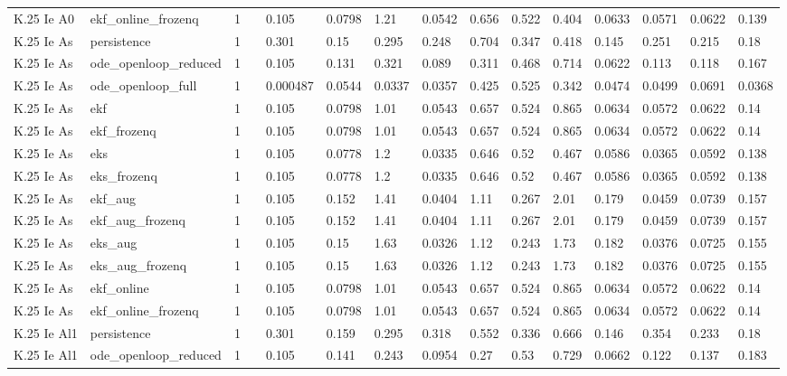 \begin{table}[t]
\begin{tabular}{lllllllllllllll}
K.25 Ie A0 & ekf\_online\_frozenq & 1 &  & 0.105 & 0.0798 & 1.21 & 0.0542 & 0.656 & 0.522 & 0.404 & 0.0633 & 0.0571 & 0.0622 & 0.139 \\
K.25 Ie As & persistence & 1 &  & 0.301 & 0.15 & 0.295 & 0.248 & 0.704 & 0.347 & 0.418 & 0.145 & 0.251 & 0.215 & 0.18 \\
K.25 Ie As & ode\_openloop\_reduced & 1 &  & 0.105 & 0.131 & 0.321 & 0.089 & 0.311 & 0.468 & 0.714 & 0.0622 & 0.113 & 0.118 & 0.167 \\
K.25 Ie As & ode\_openloop\_full & 1 &  & 0.000487 & 0.0544 & 0.0337 & 0.0357 & 0.425 & 0.525 & 0.342 & 0.0474 & 0.0499 & 0.0691 & 0.0368 \\
K.25 Ie As & ekf & 1 &  & 0.105 & 0.0798 & 1.01 & 0.0543 & 0.657 & 0.524 & 0.865 & 0.0634 & 0.0572 & 0.0622 & 0.14 \\
K.25 Ie As & ekf\_frozenq & 1 &  & 0.105 & 0.0798 & 1.01 & 0.0543 & 0.657 & 0.524 & 0.865 & 0.0634 & 0.0572 & 0.0622 & 0.14 \\
K.25 Ie As & eks & 1 &  & 0.105 & 0.0778 & 1.2 & 0.0335 & 0.646 & 0.52 & 0.467 & 0.0586 & 0.0365 & 0.0592 & 0.138 \\
K.25 Ie As & eks\_frozenq & 1 &  & 0.105 & 0.0778 & 1.2 & 0.0335 & 0.646 & 0.52 & 0.467 & 0.0586 & 0.0365 & 0.0592 & 0.138 \\
K.25 Ie As & ekf\_aug & 1 &  & 0.105 & 0.152 & 1.41 & 0.0404 & 1.11 & 0.267 & 2.01 & 0.179 & 0.0459 & 0.0739 & 0.157 \\
K.25 Ie As & ekf\_aug\_frozenq & 1 &  & 0.105 & 0.152 & 1.41 & 0.0404 & 1.11 & 0.267 & 2.01 & 0.179 & 0.0459 & 0.0739 & 0.157 \\
K.25 Ie As & eks\_aug & 1 &  & 0.105 & 0.15 & 1.63 & 0.0326 & 1.12 & 0.243 & 1.73 & 0.182 & 0.0376 & 0.0725 & 0.155 \\
K.25 Ie As & eks\_aug\_frozenq & 1 &  & 0.105 & 0.15 & 1.63 & 0.0326 & 1.12 & 0.243 & 1.73 & 0.182 & 0.0376 & 0.0725 & 0.155 \\
K.25 Ie As & ekf\_online & 1 &  & 0.105 & 0.0798 & 1.01 & 0.0543 & 0.657 & 0.524 & 0.865 & 0.0634 & 0.0572 & 0.0622 & 0.14 \\
K.25 Ie As & ekf\_online\_frozenq & 1 &  & 0.105 & 0.0798 & 1.01 & 0.0543 & 0.657 & 0.524 & 0.865 & 0.0634 & 0.0572 & 0.0622 & 0.14 \\
K.25 Ie Al1 & persistence & 1 &  & 0.301 & 0.159 & 0.295 & 0.318 & 0.552 & 0.336 & 0.666 & 0.146 & 0.354 & 0.233 & 0.18 \\
K.25 Ie Al1 & ode\_openloop\_reduced & 1 &  & 0.105 & 0.141 & 0.243 & 0.0954 & 0.27 & 0.53 & 0.729 & 0.0662 & 0.122 & 0.137 & 0.183 \\

\end{tabular}
\end{table}
